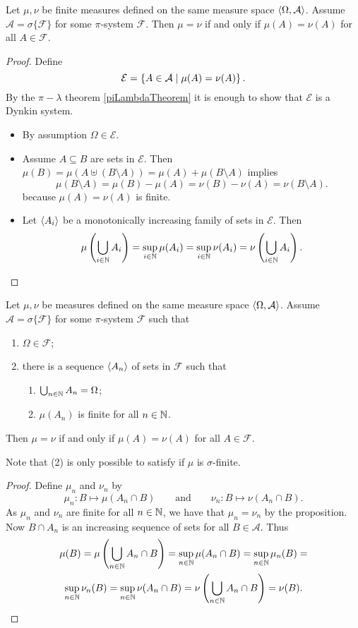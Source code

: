 \begin{proposition}
Let $\mu,\nu$ be finite measures defined on the same measure space $\left\langle \Omega, \mathcal{A} \right\rangle$. Assume $\mathcal{A} = \sigma\{\mathcal{F}\}$ for some $\pi$-system $\mathcal{F}$.
Then $\mu = \nu$ \textup{if and only if} $\mu(A) = \nu(A)$ for all $A\in\mathcal{F}$.
\end{proposition}
\begin{proof}
Define
\[ \mathcal{E} = \left\{ A\in\mathcal{A} \;\middle|\; \mu(A) = \nu(A) \right\}. \]
By the $\pi-\lambda$ theorem \ref{piLambdaTheorem} it is enough to show that $\mathcal{E}$ is a Dynkin system.
\begin{itemize}
\item By assumption $\Omega\in \mathcal{E}$.
\item Assume $A\subseteq B$ are sets in $\mathcal{E}$. Then $\mu(B) = \mu(A \uplus (B\setminus A)) = \mu(A) + \mu(B\setminus A)$ implies 
\[ \mu(B\setminus A) = \mu(B) - \mu(A) = \nu(B) - \nu(A) = \nu(B\setminus A). \]
because $\mu(A) = \nu(A)$ is finite.
\item Let $\left\langle A_i \right\rangle$ be a monotonically increasing family of sets in $\mathcal{E}$. Then
\[ \mu\left(\bigcup_{i\in\mathbb{N}}A_i\right) = \sup_{i\in\mathbb{N}}\mu(A_i) = \sup_{i\in\mathbb{N}}\nu(A_i) = \nu\left(\bigcup_{i\in\mathbb{N}}A_i\right). \]
\end{itemize}
\end{proof}
\begin{corollary}
Let $\mu,\nu$ be measures defined on the same measure space $\left\langle \Omega, \mathcal{A} \right\rangle$. Assume $\mathcal{A} = \sigma\{\mathcal{F}\}$ for some $\pi$-system $\mathcal{F}$ such that
\begin{enumerate}
\item $\Omega \in \mathcal{F}$;
\item there is a sequence $\left\langle A_n \right\rangle$ of sets in $\mathcal{F}$ such that
\begin{enumerate}
\item $\bigcup_{n\in \mathbb{N}}A_n = \Omega$;
\item $\mu(A_n)$ is finite for all $n\in \mathbb{N}$.
\end{enumerate}
\end{enumerate}
Then $\mu = \nu$ \textup{if and only if} $\mu(A) = \nu(A)$ for all $A\in\mathcal{F}$.
\end{corollary}
Note that (2) is only possible to satisfy if $\mu$ is $\sigma$-finite.
\begin{proof}
Define $\mu_n$ and $\nu_n$ by
\[ \mu_n: B\mapsto \mu(A_n\cap B) \qquad\text{and}\qquad \nu_n: B\mapsto \nu(A_n\cap B). \]
As $\mu_n$ and $\nu_n$ are finite for all $n\in\mathbb{N}$, we have that $\mu_n = \nu_n$ by the proposition. Now $B\cap A_n$ is an increasing sequence of sets for all $B\in\mathcal{A}$. Thus
\begin{multline*}
\mu(B) = \mu\left(\bigcup_{n\in \mathbb{N}}A_n\cap B\right) = \sup_{n\in\mathbb{N}}\mu(A_n\cap B) = \sup_{n\in\mathbb{N}}\mu_n(B) = \\ \sup_{n\in\mathbb{N}}\nu_n(B) = \sup_{n\in\mathbb{N}}\nu(A_n\cap B) = \nu\left(\bigcup_{n\in \mathbb{N}}A_n\cap B\right) = \nu(B). 
\end{multline*}
\end{proof}

